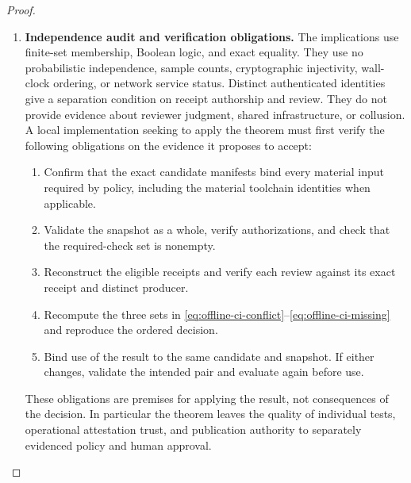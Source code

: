 \begin{proof}
\begin{enumerate}
\item \textbf{Independence audit and verification obligations.}
The implications use finite-set membership,
Boolean logic, and exact equality.
They use no probabilistic independence, sample counts,
cryptographic injectivity, wall-clock ordering, or
network service status.
Distinct authenticated identities give a separation condition
on receipt authorship and review.
They do not provide evidence about reviewer judgment,
shared infrastructure, or collusion.
A local implementation seeking to apply the theorem must
first verify the following obligations on the evidence
it proposes to accept:
\begin{enumerate}
\item Confirm that the exact candidate manifests bind every
material input required by policy, including the material
toolchain identities when applicable.
\item Validate the snapshot as a whole, verify authorizations,
and check that the required-check set is nonempty.
\item Reconstruct the eligible receipts and verify each
review against its exact receipt and distinct producer.
\item Recompute the three sets in
\eqref{eq:offline-ci-conflict}--\eqref{eq:offline-ci-missing}
and reproduce the ordered decision.
\item Bind use of the result to the same candidate and
snapshot. If either changes, validate the intended pair
and evaluate again before use.
\end{enumerate}
These obligations are premises for applying the result,
not consequences of the decision.
In particular the theorem leaves the quality of individual
tests, operational attestation trust, and publication
authority to separately evidenced policy and human approval.
\qedhere
\end{enumerate}
\end{proof}

